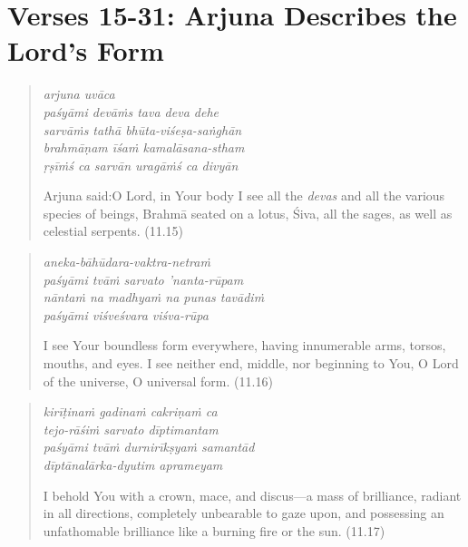 \documentclass[12pt, twoside, openright]{memoir}
\begin{document}
\section{Verses 15-31: Arjuna Describes the Lord's Form}\label{sec-verses-15-31-arjuna-describes-the-lord-s-form}



\par
\begin{verse}
\textit{arjuna uvāca} \\
\textit{paśyāmi devāṁs tava deva dehe} \\
\textit{sarvāṁs tathā bhūta-viśeṣa-saṅghān} \\
\textit{brahmāṇam īśaṁ kamalāsana-stham} \\
\textit{ṛṣīṁś ca sarvān uragāṁś ca divyān}

\noindent \quad Arjuna said:\linebreak O Lord, in Your body I see all the \textit{devas} and all the various species of beings, Brahmā seated on a lotus, Śiva, all the sages, as well as celestial serpents. (11.15)
\end{verse}
\par



\par
\begin{verse}
\textit{aneka-bāhūdara-vaktra-netraṁ} \\
\textit{paśyāmi tvāṁ sarvato ’nanta-rūpam} \\
\textit{nāntaṁ na madhyaṁ na punas tavādiṁ} \\
\textit{paśyāmi viśveśvara viśva-rūpa}

\noindent I see Your boundless form everywhere, having innumerable arms, torsos, mouths, and eyes. I see neither end, middle, nor beginning to You, O Lord of the universe, O universal form. (11.16)
\end{verse}
\par



\par
\begin{verse}
\textit{kirīṭinaṁ gadinaṁ cakriṇaṁ ca} \\
\textit{tejo-rāśiṁ sarvato dīptimantam} \\
\textit{paśyāmi tvāṁ durnirīkṣyaṁ samantād} \\
\textit{dīptānalārka-dyutim aprameyam}

\noindent I behold You with a crown, mace, and discus---a mass of brilliance, radiant in all directions, completely unbearable to gaze upon, and possessing an unfathomable brilliance like a burning fire or the sun. (11.17)
\end{verse}
\par
\end{document}
